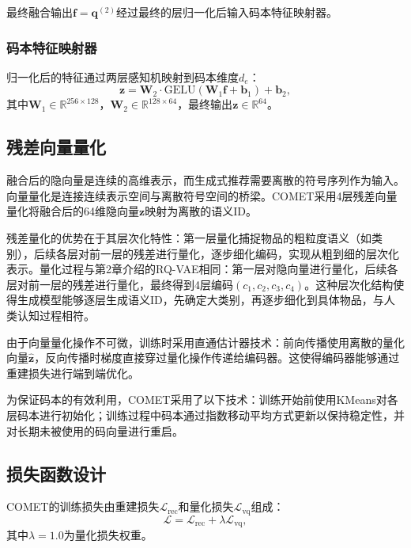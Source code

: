 最终融合输出$\mathbf{f} = \mathbf{q}^{(2)}$经过最终的层归一化后输入码本特征映射器。

\subsubsection{码本特征映射器}

归一化后的特征通过两层感知机映射到码本维度$d_e$：
\begin{equation}
  \mathbf{z} = \mathbf{W}_2 \cdot \text{GELU}(\mathbf{W}_1 \mathbf{f} + \mathbf{b}_1) + \mathbf{b}_2,
\end{equation}
其中$\mathbf{W}_1 \in \mathbb{R}^{256 \times 128}$，$\mathbf{W}_2 \in \mathbb{R}^{128 \times 64}$，最终输出$\mathbf{z} \in \mathbb{R}^{64}$。

\subsection{残差向量量化}

融合后的隐向量是连续的高维表示，而生成式推荐需要离散的符号序列作为输入。向量量化是连接连续表示空间与离散符号空间的桥梁。COMET采用4层残差向量量化将融合后的64维隐向量$\mathbf{z}$映射为离散的语义ID。

残差量化的优势在于其层次化特性：第一层量化捕捉物品的粗粒度语义（如类别），后续各层对前一层的残差进行量化，逐步细化编码，实现从粗到细的层次化表示。量化过程与第2章介绍的RQ-VAE相同：第一层对隐向量进行量化，后续各层对前一层的残差进行量化，最终得到4层编码$(c_1, c_2, c_3, c_4)$。这种层次化结构使得生成模型能够逐层生成语义ID，先确定大类别，再逐步细化到具体物品，与人类认知过程相符。

由于向量量化操作不可微，训练时采用直通估计器技术：前向传播使用离散的量化向量$\hat{\mathbf{z}}$，反向传播时梯度直接穿过量化操作传递给编码器。这使得编码器能够通过重建损失进行端到端优化。

为保证码本的有效利用，COMET采用了以下技术：训练开始前使用KMeans对各层码本进行初始化；训练过程中码本通过指数移动平均方式更新以保持稳定性，并对长期未被使用的码向量进行重启。

\subsection{损失函数设计}

COMET的训练损失由重建损失$\mathcal{L}_{\text{rec}}$和量化损失$\mathcal{L}_{\text{vq}}$组成：
\begin{equation}
  \mathcal{L} = \mathcal{L}_{\text{rec}} + \lambda \mathcal{L}_{\text{vq}},
  \label{eq:loss}
\end{equation}
其中$\lambda = 1.0$为量化损失权重。

